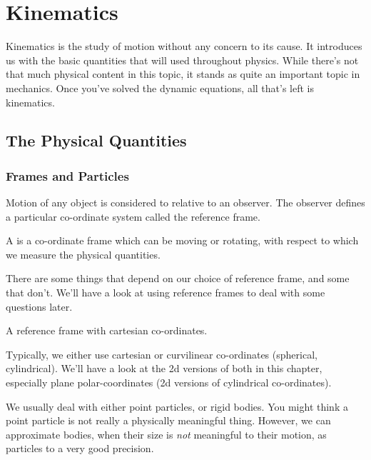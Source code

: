 \setlength{\chnumsep}{10em}
\chapter{Kinematics}


\begin{overview}
    Kinematics is the study of motion without any concern to its cause. It introduces us with the 
    basic quantities that will used throughout physics. While there's not that much physical content in this 
    topic, it stands as quite an important topic in mechanics. Once you've solved the dynamic equations, all 
    that's left is kinematics.
        \end{overview}

\section{The Physical Quantities}

\subsection{Frames and Particles}

Motion of any object is considered to relative to an observer. The observer defines a
particular co-ordinate system called the reference frame.

\begin{definition}
    A  is a co-ordinate frame which can be moving or rotating, with respect to 
    which we measure the physical quantities.
\end{definition}

There are some things that depend on our choice of reference frame, and some that
don't. We'll have a look at using reference frames to deal with some questions
later. 

\begin{marginfigure}
    \vspace{-4em}
    \caption{A reference frame with cartesian co-ordinates.}
\end{marginfigure}


Typically, we either use cartesian or curvilinear co-ordinates (spherical, cylindrical). 
We'll have a look at the 2d versions of both in this chapter, especially plane polar-coordinates 
(2d versions of cylindrical co-ordinates).

We usually deal with either point particles, or rigid bodies.  You might think a point 
particle is not really a physically meaningful thing. However, we can
approximate bodies, when their size is \emph{not} meaningful to their
motion, as particles to a very good precision. 

